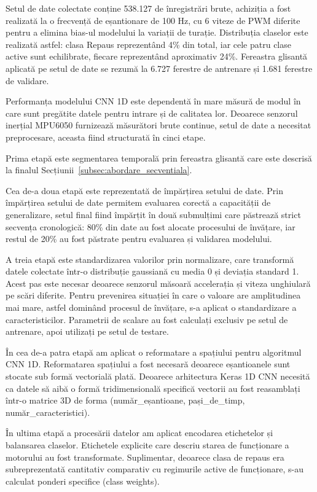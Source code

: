 	Setul de date colectate conține 538.127 de înregistrări brute, achiziția a fost realizată la o frecvență de eșantionare de 100 Hz, cu 6 viteze de PWM diferite pentru a elimina bias-ul modelului la variații de turație. Distribuția claselor este realizată astfel: clasa Repaus reprezentând 4\% din total, iar cele patru clase active sunt echilibrate, fiecare reprezentând aproximativ 24\%. Fereastra glisantă aplicată pe setul de date se rezumă la 6.727 ferestre de antrenare și 1.681 ferestre de validare.
	
	Performanța modelului CNN 1D este dependentă în mare măsură de modul în care sunt pregătite datele pentru intrare și de calitatea lor. Deoarece senzorul inerțial MPU6050 \cite{invensense:mpu6050_datasheet} furnizează măsurători brute continue, setul de date a necesitat preprocesare, aceasta fiind structurată în cinci etape.
	
	Prima etapă este segmentarea temporală prin fereastra glisantă care este descrisă la finalul Secțiunii~\ref{subsec:abordare_secventiala}.
	
	Cea de-a doua etapă este reprezentată de împărțirea setului de date. Prin împărțirea setului de date permitem evaluarea corectă a capacității de generalizare, setul final fiind împărțit în două submulțimi care păstrează strict secvența cronologică: 80\% din date au fost alocate procesului de învățare, iar restul de 20\% au fost păstrate pentru evaluarea și validarea modelului.
	
	A treia etapă este standardizarea valorilor prin normalizare, care transformă datele colectate într-o distribuție gaussiană cu media 0 și deviația standard 1. Acest pas este necesar deoarece senzorul măsoară accelerația și viteza unghiulară pe scări diferite. Pentru prevenirea situației în care o valoare are amplitudinea mai mare, astfel dominând procesul de învățare, s-a aplicat o standardizare a caracteristicilor. Parametrii de scalare au fost calculați exclusiv pe setul de antrenare, apoi utilizați pe setul de testare.
	
	În cea de-a patra etapă am aplicat o reformatare a spațiului pentru algoritmul CNN 1D. Reformatarea spațiului a fost necesară deoarece eșantioanele sunt stocate sub formă vectorială plată. Deoarece arhitectura Keras 1D CNN \cite{abadi:tensorflow} necesită ca datele să aibă o formă tridimensională specifică vectorii au fost reasamblați într-o matrice 3D de forma (număr\_eșantioane, pași\_de\_timp, număr\_caracteristici).
	
	În ultima etapă a procesării datelor am aplicat encodarea etichetelor și balansarea claselor. Etichetele explicite care descriu starea de funcționare a motorului au fost transformate. Suplimentar, deoarece clasa de repaus era subreprezentată cantitativ comparativ cu regimurile active de funcționare, s-au calculat ponderi specifice (class weights).
	
